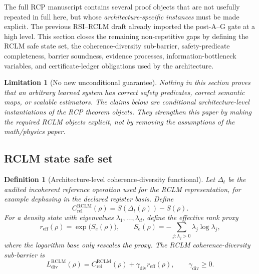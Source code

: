\documentclass[11pt,a4paper]{article}
\newtheorem{definition}[theorem]{Definition}
\newtheorem{limitation}[theorem]{Limitation}
\newcommand{\RCLM}{\mathrm{RCLM}}
\newcommand{\rel}{\mathrm{rel}}
\begin{document}
The full RCP manuscript contains several proof objects that are not usefully repeated in full here, but whose \emph{architecture-specific instances} must be made explicit. The previous RSI--RCLM draft already imported the post-A--G gate at a high level. This section closes the remaining non-repetitive gaps by defining the RCLM safe state set, the coherence-diversity sub-barrier, safety-predicate completeness, barrier soundness, evidence processes, information-bottleneck variables, and certificate-ledger obligations used by the architecture.

\begin{limitation}[No new unconditional guarantee]
Nothing in this section proves that an arbitrary learned system has correct safety predicates, correct semantic maps, or scalable estimators. The claims below are conditional architecture-level instantiations of the RCP theorem objects. They strengthen this paper by making the required RCLM objects explicit, not by removing the assumptions of the math/physics paper.
\end{limitation}

\subsection{RCLM state safe set}

\begin{definition}[Architecture-level coherence-diversity functional]
Let \(\Delta_t\) be the audited incoherent reference operation used for the RCLM representation, for example dephasing in the declared register basis. Define
\[
C_{\rel}^{\RCLM}(\rho)=S(\Delta_t(\rho))-S(\rho).
\]
For a density state with eigenvalues \(\lambda_1,\ldots,\lambda_d\), define the effective rank proxy
\[
r_{\mathrm{eff}}(\rho)=\exp\bigl(S_e(\rho)\bigr),
\qquad
S_e(\rho)=-\sum_{j:\lambda_j>0}\lambda_j\log\lambda_j,
\]
where the logarithm base only rescales the proxy. The RCLM coherence-diversity sub-barrier is
\[
L_{\mathrm{div}}^{\RCLM}(\rho)=C_{\rel}^{\RCLM}(\rho)+\gamma_{\mathrm{div}}r_{\mathrm{eff}}(\rho),
\qquad
\gamma_{\mathrm{div}}\ge0.
\]
\end{definition}
\end{document}

